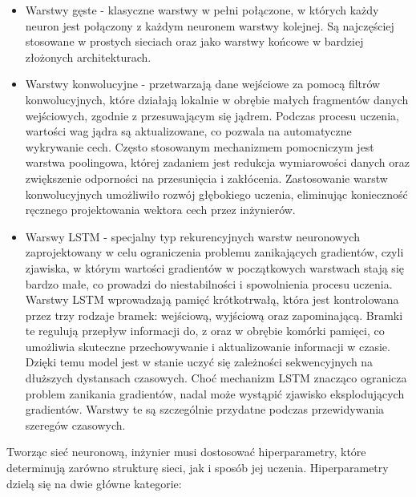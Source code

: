 \documentclass[a4paper,twoside,12pt]{book}
\begin{document}
\begin{itemize}
	\item Warstwy gęste - klasyczne warstwy w pełni połączone, w których każdy neuron jest połączony z każdym neuronem warstwy kolejnej. Są najczęściej stosowane w prostych sieciach oraz jako warstwy końcowe w bardziej złożonych architekturach.

	\item Warstwy konwolucyjne - przetwarzają dane wejściowe za pomocą filtrów konwolucyjnych, które działają lokalnie w obrębie małych fragmentów danych wejściowych, zgodnie z przesuwającym się jądrem. Podczas procesu uczenia, wartości wag jądra są aktualizowane, co pozwala na automatyczne wykrywanie cech. Często stosowanym mechanizmem pomocniczym jest warstwa poolingowa, której zadaniem jest redukcja wymiarowości danych oraz zwiększenie odporności na przesunięcia i zakłócenia.
	      Zastosowanie warstw konwolucyjnych umożliwiło rozwój głębokiego uczenia, eliminując konieczność ręcznego projektowania wektora cech przez inżynierów.

	\item Warswy LSTM - specjalny typ rekurencyjnych warstw neuronowych zaprojektowany w celu ograniczenia problemu zanikających gradientów, czyli zjawiska, w którym wartości gradientów w początkowych warstwach stają się bardzo małe, co prowadzi do niestabilności i spowolnienia procesu uczenia. Warstwy LSTM wprowadzają pamięć krótkotrwałą, która jest kontrolowana przez trzy rodzaje bramek: wejściową, wyjściową oraz zapominającą. Bramki te regulują przepływ informacji do, z oraz w obrębie komórki pamięci, co umożliwia skuteczne przechowywanie i aktualizowanie informacji w czasie. Dzięki temu model jest w stanie uczyć się zależności sekwencyjnych na dłuższych dystansach czasowych. Choć mechanizm LSTM znacząco ogranicza problem zanikania gradientów, nadal może wystąpić zjawisko eksplodujących gradientów. Warstwy te są szczególnie przydatne podczas przewidywania szeregów czasowych.
\end{itemize}
Tworząc sieć neuronową, inżynier musi dostosować hiperparametry, które determinują zarówno strukturę sieci, jak i sposób jej uczenia. Hiperparametry dzielą się na dwie główne kategorie:
\end{document}
